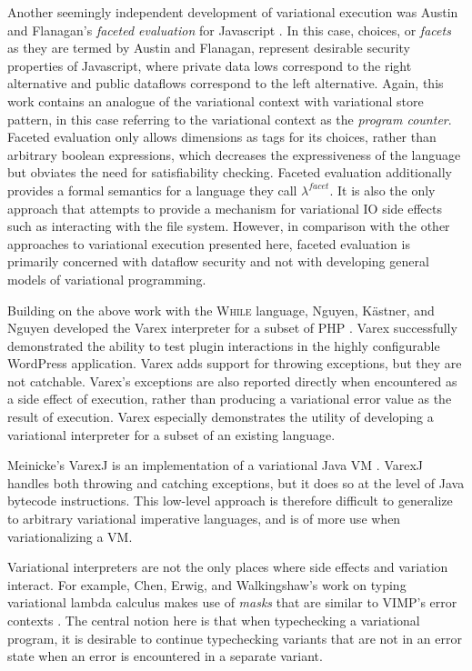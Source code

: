 \documentclass[12pt,oneside]{book}
\begin{document}
 Another seemingly independent development of variational execution was Austin and Flanagan's \emph{faceted evaluation} for Javascript \cite{faceted}.
 In this case, choices, or \emph{facets} as they are termed by Austin and Flanagan, represent desirable security properties of Javascript, where
 private data lows correspond to the right alternative and public dataflows correspond to the left alternative.
 Again, this work contains an analogue of the variational context with variational store pattern, in this case referring to the variational context as
 the \emph{program counter}. Faceted evaluation only allows dimensions as tags for its choices, rather than arbitrary boolean expressions, which
 decreases the expressiveness of the language but obviates the need for satisfiability checking. Faceted evaluation additionally provides a formal
 semantics for a language they call $\lambda^{\mathit{facet}}$. It is also the only approach that attempts to provide a mechanism for variational IO
 side effects such as interacting with the file system. However, in comparison with the other approaches to variational execution presented here,
 faceted evaluation is primarily concerned with dataflow security and not with developing general models of variational programming.
 
 Building on the above work with the \textsc{While} language, Nguyen, K\"astner, and Nguyen developed the Varex interpreter for a subset of PHP \cite{varex}.
 Varex successfully demonstrated the ability to test plugin interactions in the highly configurable WordPress application. Varex adds support for throwing
 exceptions, but they are not catchable. Varex's exceptions are also reported directly when encountered as a side effect of execution, rather than producing
 a variational error value as the result of execution. Varex especially demonstrates the utility of developing a variational interpreter for a subset of an
 existing language.
 
 Meinicke's VarexJ is an implementation of a variational Java VM \cite{varexj}. VarexJ handles both throwing and catching exceptions, but it does so
 at the level of Java bytecode instructions. This low-level approach is therefore difficult to generalize to arbitrary variational imperative languages, and
 is of more use when variationalizing a VM.
 
 Variational interpreters are not the only places where side effects and variation interact. For example, Chen, Erwig, and Walkingshaw's work
 on typing variational lambda calculus makes use of \emph{masks} that are similar to VIMP's error contexts \cite{chen2012error}. The central
 notion here is that when typechecking a variational program, it is desirable to continue typechecking variants that are not in an error state when
 an error is encountered in a separate variant.
\end{document}

